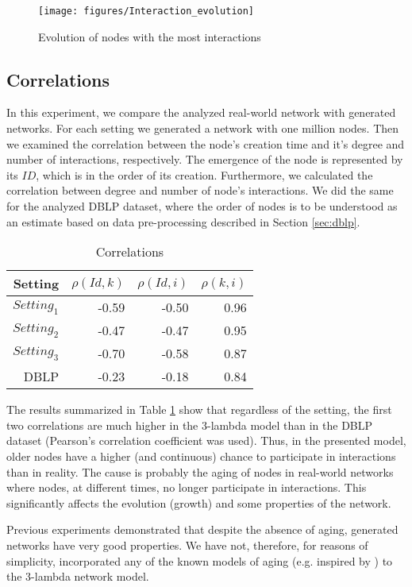\begin{figure}[ht]
\centering
\texttt{[image: figures/Interaction\_evolution]}
\caption{Evolution of nodes with the most interactions}
\label{fig:InterEvol}
\end{figure}


\subsection{Correlations}
In this experiment, we compare the analyzed real-world network with generated networks. For each setting we generated a network with one million nodes. Then we examined the correlation between the node's creation time and it's degree and number of interactions, respectively. The emergence of the node is represented by its $ID$, which is in the order of its creation. Furthermore, we calculated the correlation between degree and number of node's interactions. We did the same for the analyzed DBLP dataset, where the order of nodes is to be understood as an estimate based on data pre-processing described in Section \ref{sec:dblp}.

\begin{table}[ht]
  \centering
  \caption{Correlations}
\begin{tabular}{|r|rrr|}
	\hline
Setting & $\rho(Id, k)$ & $\rho(Id, i)$ & $\rho(k, i)$ \\ 
\hline
$Setting_1$ & -0.59 & -0.50 & 0.96 \\  
\hline	
$Setting_2$ & -0.47 & -0.47 & 0.95 \\ 
\hline	
$Setting_3$ & -0.70 & -0.58 & 0.87 \\ 
\hline
DBLP & -0.23 & -0.18 & 0.84 \\ 
\hline
	\end{tabular}%
  \label{tab:corr}%
\end{table}%

The results summarized in Table \ref{tab:corr} show that regardless of the setting, the first two correlations are much higher in the 3-lambda model than in the DBLP dataset (Pearson's correlation coefficient was used). Thus, in the presented model, older nodes have a higher (and continuous) chance to participate in interactions than in reality. The cause is probably the aging of nodes in real-world networks where nodes, at different times, no longer participate in interactions. This significantly affects the evolution (growth) and some properties of the network.

Previous experiments demonstrated that despite the absence of aging, generated networks have very good properties. We have not, therefore, for reasons of simplicity, incorporated any of the known models of aging (e.g. inspired by \cite{dorogovtsev2000evolution, xu2010evolutionary}) to the 3-lambda network model.